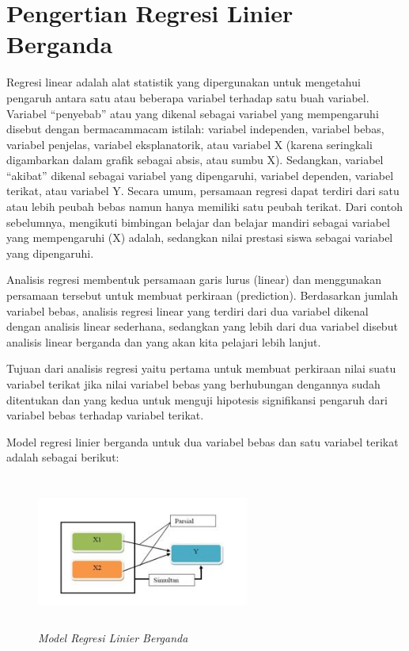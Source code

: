\section{Pengertian Regresi Linier Berganda}
\par Regresi linear adalah alat statistik yang dipergunakan untuk mengetahui pengaruh antara satu atau beberapa variabel terhadap satu buah variabel. Variabel “penyebab” atau yang dikenal sebagai variabel yang mempengaruhi disebut dengan bermacammacam istilah: variabel independen, variabel bebas, variabel penjelas, variabel eksplanatorik, atau variabel X (karena seringkali digambarkan dalam grafik sebagai absis, atau sumbu X). Sedangkan, variabel “akibat” dikenal sebagai variabel yang dipengaruhi, variabel dependen, variabel terikat, atau variabel Y. Secara umum, persamaan regresi dapat terdiri dari satu atau lebih peubah bebas namun hanya memiliki satu peubah terikat. Dari contoh sebelumnya, mengikuti bimbingan belajar dan belajar mandiri sebagai variabel yang mempengaruhi (X) adalah, sedangkan nilai prestasi siswa sebagai variabel yang dipengaruhi.  
\par Analisis regresi membentuk persamaan garis lurus (linear) dan menggunakan persamaan tersebut untuk membuat perkiraan (prediction). Berdasarkan jumlah variabel bebas, analisis regresi linear yang terdiri dari dua variabel dikenal dengan analisis linear sederhana, sedangkan yang lebih dari dua variabel disebut analisis linear berganda dan yang akan kita pelajari lebih lanjut.  
\par Tujuan dari analisis regresi yaitu pertama untuk membuat perkiraan nilai suatu variabel terikat jika nilai variabel bebas yang berhubungan dengannya sudah ditentukan dan yang kedua untuk menguji hipotesis signifikansi pengaruh dari variabel bebas terhadap variabel terikat.  
\par Model regresi linier berganda untuk dua variabel bebas dan satu variabel terikat adalah sebagai berikut: 
\begin{figure}[ht]
\centering
\includegraphics[width=7cm, height=5cm]{figures/modelregresi.JPG}
\caption{\textit{Model Regresi Linier Berganda}
\label{eq:31}}
\end{figure} 
